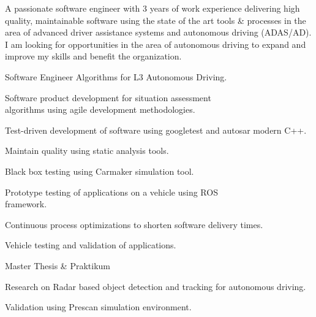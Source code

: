 \documentclass[
	a4paper,
]{fortysecondscv}
\begin{document}
\makefrontsidebar

A passionate software engineer with 3 years of work experience
delivering high quality, maintainable software using the state of the art
tools \& processes in the area of advanced driver assistance systems and autonomous driving (ADAS/AD). I am looking
for opportunities in the area of autonomous driving to expand and improve my skills and benefit the organization.

\begin{cvtable}[3]
{Software Engineer Algorithms for L3 Autonomous Driving.
	\begin{compactitem}
	\item Software product development for situation assessment \\algorithms using agile development methodologies.
	\item Test-driven development of software using googletest and autosar modern C++.
	\item Maintain quality using static analysis tools.
	\item Black box testing using Carmaker simulation tool.
	\item Prototype testing of applications on a vehicle using ROS \\framework.
	\item Continuous process optimizations to shorten software delivery times.
	\item Vehicle testing and validation of applications.
	\end{compactitem}
}

		
	{Master Thesis \& Praktikum
	\begin{compactitem}
	\item Research on Radar based object detection and tracking for autonomous driving.
	\item Validation using Prescan simulation environment.
	\end{compactitem}
	}



\end{cvtable}
\end{document}
